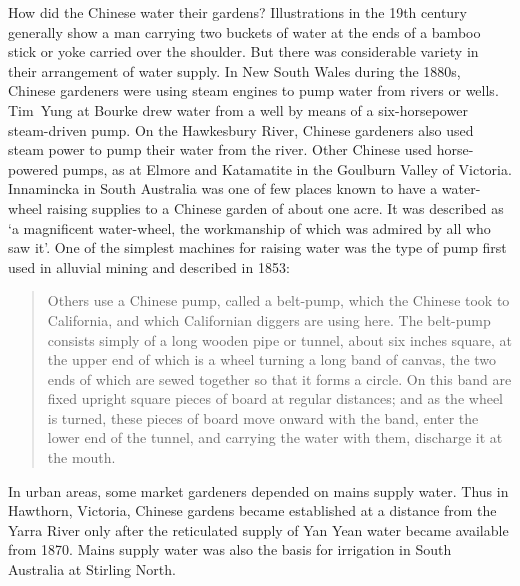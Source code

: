 How did the Chinese  water their gardens?
Illustrations in the 19th century generally show a man carrying two
buckets of water at the ends of a bamboo stick or yoke carried over
the shoulder.  But there was considerable variety in their arrangement
of water supply.  In New South Wales during the 1880s, Chinese
gardeners were using steam engines to pump water from rivers or wells.
Tim~Yung at Bourke drew water from a well by means of a six-horsepower
steam-driven pump.  On the Hawkesbury River,
 Chinese gardeners also used steam power to
pump their water from the river.  Other Chinese used horse-powered
pumps,  as at Elmore and Katamatite in the
Goulburn Valley  of Victoria.  Innamincka
 in
South Australia was one of few places known to have a water-wheel
raising supplies to a Chinese garden of about one acre.  It was
described as `a magnificent water-wheel, the workmanship of which was
admired by all who saw it'.  One of the simplest machines for
raising water was the type of pump  first used in
alluvial mining and described in 1853:
\begin{quote}	
	Others use a Chinese pump, called a belt-pump, which the
	Chinese took to California, and which Californian diggers are
	using here.  The belt-pump consists simply of a long wooden
	pipe or tunnel, about six inches square, at the upper end of
	which is a wheel turning a long band of canvas, the two ends
	of which are sewed together so that it forms a circle.  On
	this band are fixed upright square pieces of board at regular
	distances; and as the wheel is turned, these pieces of board
	move onward with the band, enter the lower end of the tunnel,
	and carrying the water with them, discharge it at the
	mouth.
\end{quote}

In urban areas, some market gardeners depended on mains supply water.
Thus in Haw\-th\-orn,  Victoria, Chinese gardens
became established at a distance from the Yarra River
 only after the reticulated supply of Yan Yean
 water became available from 1870.  Mains
supply water was also the basis for irrigation in South Australia at
Stirling 
North.

